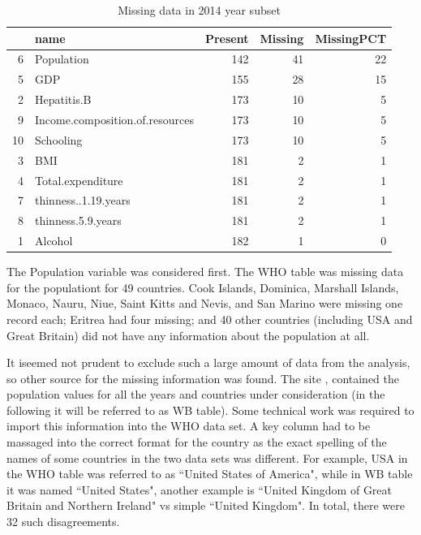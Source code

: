 \begin{table}[ht]
\centering
\begin{tabular}{rlrrr}
  \toprule
 & name & Present & Missing & MissingPCT \\ 
  \midrule
6 & Population & 142 &  41 &  22 \\ 
  5 & GDP & 155 &  28 &  15 \\ 
  2 & Hepatitis.B & 173 &  10 &   5 \\ 
  9 & Income.composition.of.resources & 173 &  10 &   5 \\ 
  10 & Schooling & 173 &  10 &   5 \\ 
  3 & BMI & 181 &   2 &   1 \\ 
  4 & Total.expenditure & 181 &   2 &   1 \\ 
  7 & thinness..1.19.years & 181 &   2 &   1 \\ 
  8 & thinness.5.9.years & 181 &   2 &   1 \\ 
  1 & Alcohol & 182 &   1 &   0 \\ 
   \bottomrule
\end{tabular}
\caption{Missing data in 2014 year subset}
\label{tab:missing}
\end{table}

The Population variable was considered first. The WHO table was missing data for the populationt for 49 countries. Cook Islands, Dominica, Marshall Islands, Monaco, Nauru, Niue, Saint Kitts and Nevis, and San Marino were missing one record each; Eritrea had four missing; and 40 other countries (including USA and Great Britain) did not have any information about the population at all.

It iseemed not prudent to exclude such a large amount of data from the analysis, so other source for the missing information was found. The site \cite{WB}, contained the population values for all the years and countries under consideration (in the following it will be referred to as WB table). Some technical work was required to import this information into the WHO data set. A key column had to be massaged into the correct format for the country as the exact spelling of the names of some countries in the two data sets was different. For example, USA in the WHO table was referred to as ``United States of America", while in WB table it was named ``United States", another example is ``United Kingdom of Great Britain and Northern Ireland" vs simple ``United Kingdom".  In total, there were 32 such disagreements.


